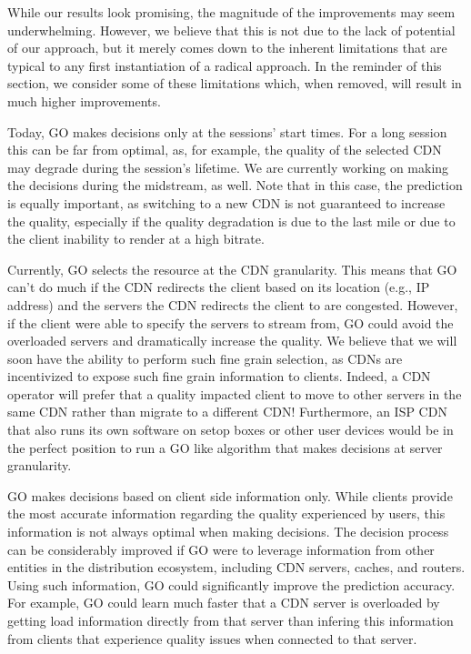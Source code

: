 
While our results look promising, the magnitude of the improvements
may seem underwhelming. However, we believe that this is not due to
the lack of potential of our approach, but it merely comes down to the
inherent limitations that are typical to any first instantiation of a
radical approach. In the reminder of this section, we consider some of
these limitations which, when removed, will result in much higher
improvements.

 Today, GO makes decisions only at
the sessions' start times. For a long session this can be far from
optimal, as, for example, the quality of the selected CDN may degrade
during the session's lifetime. We are currently working on making the
decisions during the midstream, as well. Note that in this case, the
prediction is equally important, as switching to a new CDN is not
guaranteed to increase the quality, especially if the quality
degradation is due to the last mile or due to the client inability to
render at a high bitrate.

 Currently, GO selects the resource
 at the CDN granularity. This means that GO can't do much if the CDN
 redirects the client based on its location (e.g., IP address) and the
 servers the CDN redirects the client to are congested. However, if
 the client were able to specify the servers to stream from, GO could
 avoid the overloaded servers and dramatically increase the
 quality. We believe that we will soon have the ability to perform
 such fine grain selection, as CDNs are incentivized to expose such
 fine grain information to clients. Indeed, a CDN operator will prefer
 that a quality impacted client to move to other servers in the same
 CDN rather than migrate to a different CDN! Furthermore, an ISP CDN
 that also runs its own software on setop boxes or other user devices
 would be in the perfect position to run a GO like algorithm that
 makes decisions at server granularity.

 GO makes
decisions based on client side information only. While clients provide
the most accurate information regarding the quality experienced by
users, this information is not always optimal when making
decisions. The decision process can be considerably improved if GO
were to leverage information from other entities in the distribution
ecosystem, including CDN servers, caches, and routers. Using such
information, GO could significantly improve the prediction
accuracy. For example, GO could learn much faster that a CDN server is
overloaded by getting load information directly from that server than
infering this information from clients that experience quality issues
when connected to that server.

